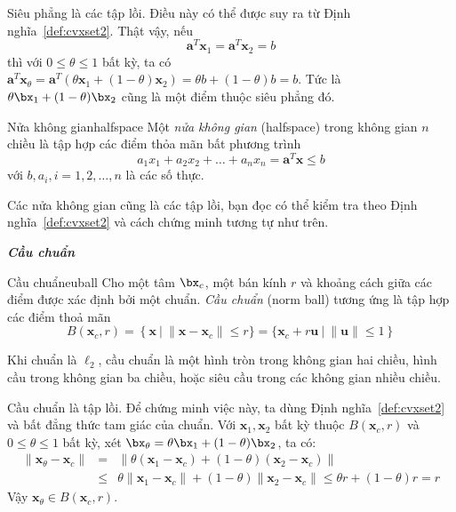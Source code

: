 Siêu phẳng là các {tập lồi}. Điều này có thể được suy ra từ Định
nghĩa~\ref{def:cvxset2}. Thật vậy, nếu
\begin{equation*} 
\mathbf{a}^T\mathbf{x}_1 = \mathbf{a}^T\mathbf{x}_2 = b 
\end{equation*} 
thì với $0 \leq \theta \leq 1$ bất kỳ, ta có 
\begin{math} 
\mathbf{a}^T\mathbf{x}_{\theta} = \mathbf{a}^T(\theta \mathbf{x}_1 + (1 - \theta)\mathbf{x}_2) = \theta b + (1 - \theta) b  = b. 
\end{math} 
Tức là $\theta \bx_1 + (1 - \theta)\bx_2$ cũng là một điểm thuộc siêu phẳng đó. 
\begin{mydef}{Nửa không gian}{halfspace}
    Một \textit{nửa không gian} ({halfspace}) trong không gian $n$ chiều là
    tập hợp các điểm thỏa mãn bất phương trình
    \begin{equation*} 
    a_1 x_1 + a_2 x_2 + \dots + a_n x_n = \mathbf{a}^T\mathbf{x} \leq b 
    \end{equation*} 
    với $b, a_i, i = 1, 2, \dots, n$ là các số thực. 
\end{mydef}
 
Các nửa không gian cũng là các tập lồi, bạn đọc có thể kiểm tra theo Định
nghĩa~\ref{def:cvxset2} và cách chứng minh tương tự như trên. 
 
\textit{\textbf{Cầu chuẩn}}
\begin{mydef}{Cầu chuẩn}{euball}
    Cho một tâm $\bx_c$, một bán kính $r$ và khoảng cách giữa các điểm được
    xác định bởi một chuẩn. \textit{Cầu chuẩn} (norm ball) tương ứng là tập hợp các điểm thoả
    mãn 
    \begin{equation*}
    B(\mathbf{x}_c, r) = \left\{\mathbf{x} ~\big|~ \|\mathbf{x} - \mathbf{x}_c\| \leq r \} = \{\mathbf{x}_c + r\mathbf{u} ~\big|~ \|\mathbf{u}\| \leq 1\right\} 
    \end{equation*} 
\end{mydef}
Khi chuẩn là $\ell_2$, cầu chuẩn là một hình tròn trong không gian hai chiều,
hình cầu trong không gian ba chiều, hoặc siêu cầu trong các không gian nhiều
chiều. %

Cầu chuẩn là tập lồi. Để chứng minh việc này, ta dùng Định nghĩa~\ref{def:cvxset2} và
bất đẳng thức tam giác của chuẩn. Với $\mathbf{x}_1, \mathbf{x}_2$ bất kỳ thuộc
$B(\mathbf{x}_c, r)$ và $0 \leq \theta \leq 1$ bất kỳ, xét $\bx_{\theta} =
\theta \bx_1 + (1 - \theta)\bx_2$, ta có: 
\begin{eqnarray*} 
\|\mathbf{x}_{\theta} - \mathbf{x}_c\| &=& \|\theta(\mathbf{x}_1 - \mathbf{x}_c)  + (1 - \theta) (\mathbf{x}_2 - \mathbf{x}_c)\| \\\ 
&\leq& \theta \|\mathbf{x}_1 - \mathbf{x}_c\| + (1 - \theta)\|\mathbf{x}_2 - \mathbf{x}_c\| 
\leq \theta r + ( 1 - \theta) r = r 
\end{eqnarray*} 
Vậy $\mathbf{x}_{\theta} \in B(\mathbf{x}_c, r)$. 
 
